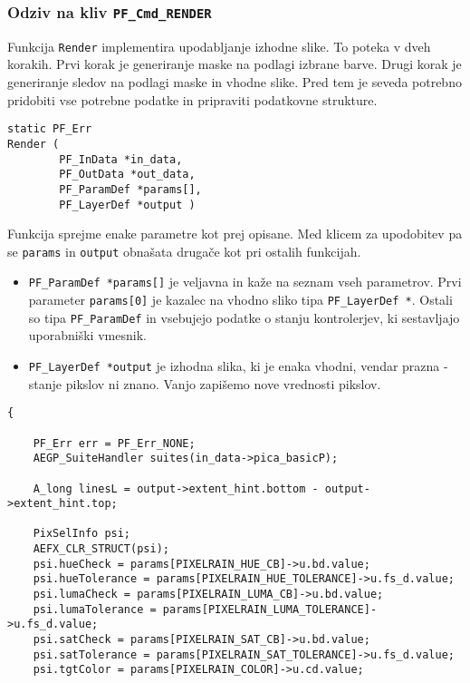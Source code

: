 \documentclass[a4paper, 12pt]{book}
\begin{document}
\subsubsection{Odziv na kliv \texttt{PF\_Cmd\_RENDER}}

Funkcija \texttt{Render} implementira upodabljanje izhodne slike.
To poteka v dveh korakih.
Prvi korak je generiranje maske na podlagi izbrane barve.
Drugi korak je generiranje sledov na podlagi maske in vhodne slike.
Pred tem je seveda potrebno pridobiti vse potrebne podatke in pripraviti podatkovne strukture.

\begin{verbatim}
static PF_Err 
Render (
        PF_InData *in_data,
        PF_OutData *out_data,
        PF_ParamDef *params[],
        PF_LayerDef *output )
\end{verbatim}

Funkcija sprejme enake parametre kot prej opisane.
Med klicem za upodobitev pa se \texttt{params} in \texttt{output} obnašata drugače kot pri ostalih funkcijah.
\begin{itemize}
\item{\texttt{PF\_ParamDef *params[]} je veljavna in kaže na seznam vseh parametrov. 
	Prvi parameter \texttt{params[0]} je kazalec na vhodno sliko tipa \texttt{PF\_LayerDef *}.
	Ostali so tipa \texttt{PF\_ParamDef} in vsebujejo podatke o stanju kontrolerjev, ki sestavljajo uporabniški vmesnik.}
\item{\texttt{PF\_LayerDef *output} je izhodna slika, ki je enaka vhodni, vendar prazna - stanje pikslov ni znano. 
	Vanjo zapišemo nove vrednosti pikslov.  }
\end{itemize}

\begin{verbatim}
{

	PF_Err err = PF_Err_NONE;
	AEGP_SuiteHandler suites(in_data->pica_basicP);

	A_long linesL = output->extent_hint.bottom - output->extent_hint.top;
	
	PixSelInfo psi;
	AEFX_CLR_STRUCT(psi);
	psi.hueCheck = params[PIXELRAIN_HUE_CB]->u.bd.value;
	psi.hueTolerance = params[PIXELRAIN_HUE_TOLERANCE]->u.fs_d.value;
	psi.lumaCheck = params[PIXELRAIN_LUMA_CB]->u.bd.value;
	psi.lumaTolerance = params[PIXELRAIN_LUMA_TOLERANCE]->u.fs_d.value;
	psi.satCheck = params[PIXELRAIN_SAT_CB]->u.bd.value;
	psi.satTolerance = params[PIXELRAIN_SAT_TOLERANCE]->u.fs_d.value;
	psi.tgtColor = params[PIXELRAIN_COLOR]->u.cd.value;
\end{verbatim}
\end{document}
